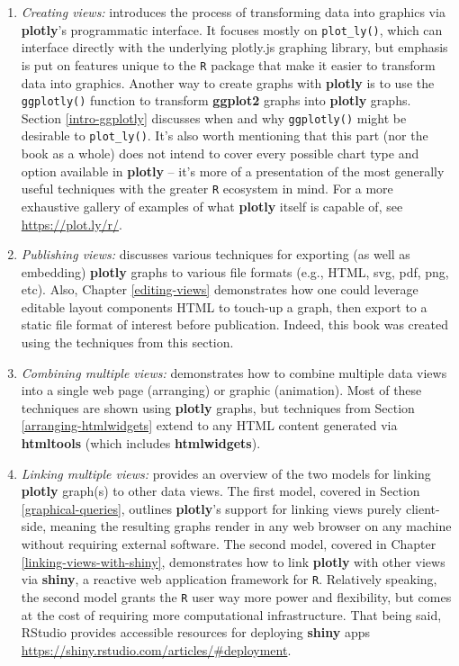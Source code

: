 \documentclass[
  12pt,
]{krantz}
\begin{document}
\begin{enumerate}
\def\labelenumi{\arabic{enumi}.}
\item
  \emph{Creating views:} introduces the process of transforming data into graphics via \textbf{plotly}'s programmatic interface. It focuses mostly on \texttt{plot\_ly()}, which can interface directly with the underlying plotly.js graphing library, but emphasis is put on features unique to the \texttt{R} package that make it easier to transform data into graphics. Another way to create graphs with \textbf{plotly} is to use the \texttt{ggplotly()} function to transform \textbf{ggplot2} graphs into \textbf{plotly} graphs. Section \ref{intro-ggplotly} discusses when and why \texttt{ggplotly()} might be desirable to \texttt{plot\_ly()}. It's also worth mentioning that this part (nor the book as a whole) does not intend to cover every possible chart type and option available in \textbf{plotly} -- it's more of a presentation of the most generally useful techniques with the greater \texttt{R} ecosystem in mind. For a more exhaustive gallery of examples of what \textbf{plotly} itself is capable of, see \url{https://plot.ly/r/}.
\item
  \emph{Publishing views:} discusses various techniques for exporting (as well as embedding) \textbf{plotly} graphs to various file formats (e.g., HTML, svg, pdf, png, etc). Also, Chapter \ref{editing-views} demonstrates how one could leverage editable layout components HTML to touch-up a graph, then export to a static file format of interest before publication. Indeed, this book was created using the techniques from this section.
\item
  \emph{Combining multiple views:} demonstrates how to combine multiple data views into a single web page (arranging) or graphic (animation). Most of these techniques are shown using \textbf{plotly} graphs, but techniques from Section \ref{arranging-htmlwidgets} extend to any HTML content generated via \textbf{htmltools} (which includes \textbf{htmlwidgets}).
\item
  \emph{Linking multiple views:} provides an overview of the two models for linking \textbf{plotly} graph(s) to other data views. The first model, covered in Section \ref{graphical-queries}, outlines \textbf{plotly}'s support for linking views purely client-side, meaning the resulting graphs render in any web browser on any machine without requiring external software. The second model, covered in Chapter \ref{linking-views-with-shiny}, demonstrates how to link \textbf{plotly} with other views via \textbf{shiny}, a reactive web application framework for \texttt{R}. Relatively speaking, the second model grants the \texttt{R} user way more power and flexibility, but comes at the cost of requiring more computational infrastructure. That being said, RStudio provides accessible resources for deploying \textbf{shiny} apps \url{https://shiny.rstudio.com/articles/\#deployment}.

\end{enumerate}
\end{document}
